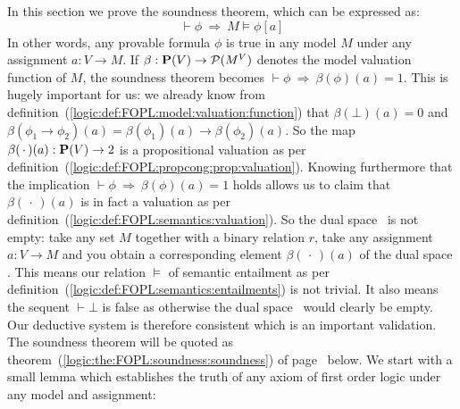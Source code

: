 In this section we prove the soundness theorem, which can be
expressed as:
    \[
    \vdash\phi\ \Rightarrow\ M\vDash\phi[a]
    \]
In other words, any provable formula $\phi$ is true in any model $M$
under any assignment $a:V\to M$. If $\beta:\mbox{${\bf P}(V)$}\to {\cal P}(M^{V})$
denotes the model valuation function of $M$, the soundness theorem
becomes $\vdash\phi\ \Rightarrow\ \beta(\phi)(a)=1$. This is hugely
important for us: we already know from
definition~(\ref{logic:def:FOPL:model:valuation:function}) that
$\beta(\bot)(a)=0$ and
$\beta(\phi_{1}\to\phi_{2})(a)=\beta(\phi_{1})(a)\to\beta(\phi_{2})(a)$.
So the map $\beta(\,\cdot\,)(a):\mbox{${\bf P}(V)$}\to 2$ is a propositional
valuation as per
definition~(\ref{logic:def:FOPL:propcong:prop:valuation}). Knowing
furthermore that the implication $\vdash\phi\ \Rightarrow\
\beta(\phi)(a)=1$ holds allows us to claim that
$\beta(\,\cdot\,)(a)$ is in fact a valuation as per
definition~(\ref{logic:def:FOPL:semantics:valuation}). So the dual
space \pvd\ is not empty: take any set $M$ together with a binary
relation $r$, take any assignment $a:V\to M$ and you obtain a
corresponding element $\beta(\,\cdot\,)(a)$ of the dual space \pvd.
This means our relation $\vDash$ of semantic entailment as per
definition~(\ref{logic:def:FOPL:semantics:entailments}) is not
trivial. It also means the sequent $\vdash\bot$ is false as
otherwise the dual space \pvd\ would clearly be empty. Our deductive
system is therefore consistent which is an important validation. The
soundness theorem will be quoted as
theorem~(\ref{logic:the:FOPL:soundness:soundness}) of
page~\pageref{logic:the:FOPL:soundness:soundness} below. We start
with a small lemma which establishes the truth of any axiom of first
order logic under any model and assignment:

